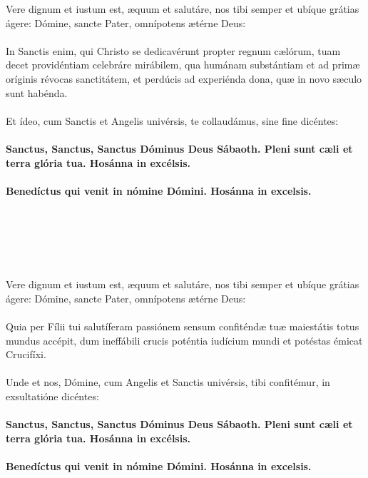 \documentclass[12pt, a4paper]{article}
\begin{document}
	\newpage
	
	\\
	\\
	\\
	\\
	\\
	Vere dignum et iustum est, æquum
	et salutáre, nos tibi semper et
	ubíque grátias ágere: Dómine,
	sancte Pater, omnípotens ætérne
	Deus:
	\\\\
	In Sanctis enim, qui Christo se dedicavérunt
	propter regnum cælórum,
	tuam decet providéntiam celebráre mirábilem,
	qua humánam substántiam
	et ad primæ oríginis révocas sanctitátem,
	et perdúcis ad experiénda dona,
	quæ in novo sæculo sunt habénda.
	\\\\
	Et ídeo, cum Sanctis et Angelis univérsis,
	te collaudámus, sine fine dicéntes:   
	\\\\
	\textbf{Sanctus, Sanctus, Sanctus Dóminus
		Deus Sábaoth. Pleni sunt cæli et
		terra glória tua. Hosánna in
		excélsis.}
	\\\\
	\textbf{Benedíctus qui venit in nómine
		Dómini. Hosánna in excelsis.}
	
	\newpage
	
	\\
	\\
	\\
	\\
	\\
	Vere dignum et iustum est, æquum
	et salutáre, nos tibi semper et
	ubíque grátias ágere: Dómine,
	sancte Pater, omnípotens ætérne
	Deus:
	\\\\
	Quia per Fílii tui salutíferam
	passiónem sensum confiténdæ tuæ
	maiestátis totus mundus accépit,
	dum ineffábili crucis poténtia
	iudícium mundi et potéstas émicat
	Crucifíxi.
	\\\\
	Unde et nos, Dómine,
	cum Angelis et Sanctis univérsis,
	tibi confitémur, in exsultatióne
	dicéntes:
	\\\\
	\textbf{Sanctus, Sanctus, Sanctus Dóminus
		Deus Sábaoth. Pleni sunt cæli et
		terra glória tua. Hosánna in
		excélsis.}
	\\\\
	\textbf{Benedíctus qui venit in nómine
		Dómini. Hosánna in excelsis.}
	
\end{document}
